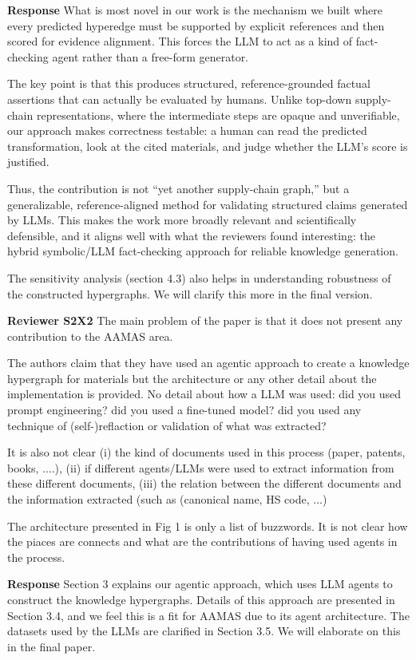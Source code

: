 \color{black}

\textbf{Response}
What is most novel in our work is the mechanism we built where every predicted hyperedge must be supported by explicit references and then scored for evidence alignment. This forces the LLM to act as a kind of fact-checking agent rather than a free-form generator.

The key point is that this produces structured, reference-grounded factual assertions that can actually be evaluated by humans. Unlike top-down supply-chain representations, where the intermediate steps are opaque and unverifiable, our approach makes correctness testable: a human can read the predicted transformation, look at the cited materials, and judge whether the LLM's score is justified.

Thus, the contribution is not ``yet another supply-chain graph,'' but a generalizable, reference-aligned method for validating structured claims generated by LLMs. This makes the work more broadly relevant and scientifically defensible, and it aligns well with what the reviewers found interesting: the hybrid symbolic/LLM fact-checking approach for reliable knowledge generation.

The sensitivity analysis (section 4.3) also helps in understanding robustness of the constructed hypergraphs.
We will clarify this more in the final version.

\noindent
\textbf{Reviewer S2X2}
\color{blue}
The main problem of the paper is that it does not present any contribution to the AAMAS area.

The authors claim that they have used an agentic approach to create a knowledge hypergraph for materials but the architecture or any other detail about the implementation is provided. No detail about how a LLM was used: did you used prompt engineering? did you used a fine-tuned model? did you used any technique of (self-)reflaction or validation of what was extracted?

It is also not clear (i) the kind of documents used in this process (paper, patents, books, ....), (ii) if different agents/LLMs were used to extract information from these different documents, (iii) the relation between the different documents and the information extracted (such as (canonical name, HS code, ...)

The architecture presented in Fig 1 is only a list of buzzwords. It is not clear how the piaces are connects and what are the contributions of having used agents in the process.
\color{black}

\textbf{Response}
Section 3 explains our agentic approach, which uses LLM agents to construct the knowledge hypergraphs.
Details of this approach are presented in Section 3.4, and we feel this is a fit for AAMAS due to its agent architecture.
The datasets used by the LLMs are clarified in Section 3.5.
We will elaborate on this in the final paper.

